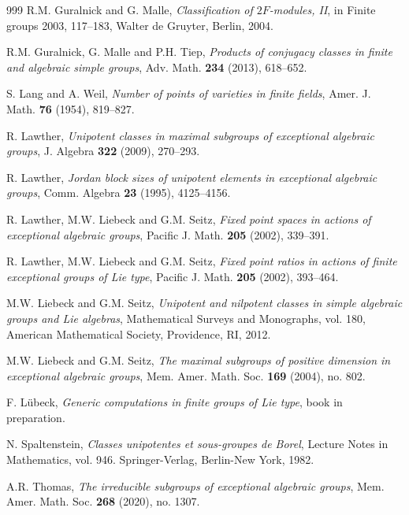 \documentclass[twoside,a4paper,reqno,11pt]{amsart}
\newcommand{\<}{\langle}
\renewcommand{\>}{\rangle}
\renewcommand{\:}{\colon}
\theoremstyle{plain}
\theoremstyle{definition}
\begin{document}
\begin{thebibliography}{999}
R.M. Guralnick and G. Malle, \emph{Classification of $2F$-modules, II}, in Finite groups 2003, 117--183, Walter de Gruyter, Berlin, 2004.
  
 R.M. Guralnick, G. Malle and P.H. Tiep, \emph{Products of conjugacy classes in finite and algebraic simple groups}, Adv. Math. \textbf{234} (2013), 618--652.

S. Lang and A. Weil, \emph{Number of points of varieties in finite fields}, Amer. J. Math. \textbf{76} (1954), 819--827.

 R. Lawther, \emph{Unipotent classes in maximal subgroups of exceptional algebraic groups}, J. Algebra \textbf{322} (2009), 270--293.

 R. Lawther, \emph{Jordan block sizes of unipotent elements in exceptional algebraic groups}, Comm. Algebra \textbf{23} (1995), 4125--4156.

 R. Lawther, M.W. Liebeck and G.M. Seitz, \emph{Fixed point spaces in actions of exceptional algebraic groups}, Pacific J. Math. \textbf{205} (2002), 339--391.

 R. Lawther, M.W. Liebeck and G.M. Seitz, \emph{Fixed point ratios in actions of finite exceptional groups of Lie type}, Pacific J. Math. \textbf{205} (2002),  393--464.

 M.W. Liebeck and G.M. Seitz, \emph{Unipotent and nilpotent classes in simple algebraic groups and Lie algebras}, Mathematical Surveys and Monographs, vol. 180, American Mathematical Society, Providence, RI, 2012.

 M.W. Liebeck and G.M. Seitz, \emph{The maximal subgroups of positive dimension in exceptional algebraic groups}, Mem. Amer. Math. Soc. \textbf{169} (2004), no. 802.

 F. L\"{u}beck, \emph{Generic computations in finite groups of Lie type}, book in preparation.

 N. Spaltenstein, \emph{Classes unipotentes et sous-groupes de Borel},  Lecture Notes in Mathematics, vol. 946. Springer-Verlag, Berlin-New York, 1982.

 A.R. Thomas, \emph{The irreducible subgroups of exceptional algebraic groups}, Mem. Amer. Math. Soc. \textbf{268} (2020), no. 1307.

\end{thebibliography}
\end{document}
